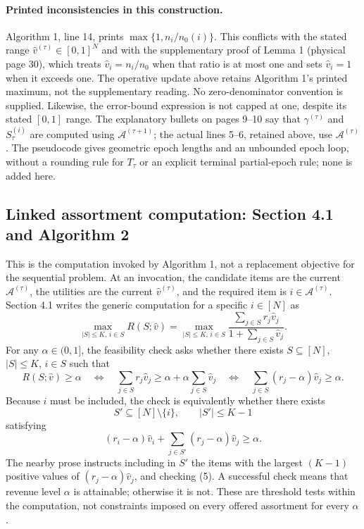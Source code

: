 \documentclass{article}
\begin{document}
\paragraph{Printed inconsistencies in this construction.}
Algorithm 1, line 14, prints $\max\{1,n_i/n_0(i)\}$. This conflicts with the stated range $\widehat v^{(\tau)}\in[0,1]^N$ and with the supplementary proof of Lemma 1 (physical page 30), which treats $\widehat v_i=n_i/n_0$ when that ratio is at most one and sets $\widehat v_i=1$ when it exceeds one. The operative update above retains Algorithm 1's printed maximum, not the supplementary reading. No zero-denominator convention is supplied. Likewise, the error-bound expression is not capped at one, despite its stated $[0,1]$ range. The explanatory bullets on pages 9--10 say that $\gamma^{(\tau)}$ and $S_\tau^{(i)}$ are computed using $\mathcal A^{(\tau+1)}$; the actual lines 5--6, retained above, use $\mathcal A^{(\tau)}$. The pseudocode gives geometric epoch lengths and an unbounded epoch loop, without a rounding rule for $T_\tau$ or an explicit terminal partial-epoch rule; none is added here.

\subsection*{Linked assortment computation: Section 4.1 and Algorithm 2}
This is the computation invoked by Algorithm 1, not a replacement objective for the sequential problem. At an invocation, the candidate items are the current $\mathcal A^{(\tau)}$, the utilities are the current $\widehat v^{(\tau)}$, and the required item is $i\in\mathcal A^{(\tau)}$. Section 4.1 writes the generic computation for a specific $i\in[N]$ as
\begin{equation}
\max_{|S|\le K,\,i\in S}R(S;\widehat v)
=\max_{|S|\le K,\,i\in S}
\frac{\sum_{j\in S}r_j\widehat v_j}{1+\sum_{j\in S}\widehat v_j}.
\tag{4}
\end{equation}
For any $\alpha\in(0,1]$, the feasibility check asks whether there exists $S\subseteq[N]$, $|S|\le K$, $i\in S$ such that
\[
R(S;\widehat v)\ge\alpha
\quad\Longleftrightarrow\quad
\sum_{j\in S}r_j\widehat v_j
\ge\alpha+\alpha\sum_{j\in S}\widehat v_j
\quad\Longleftrightarrow\quad
\sum_{j\in S}(r_j-\alpha)\widehat v_j\ge\alpha.
\]
Because $i$ must be included, the check is equivalently whether there exists
\[
S'\subseteq[N]\setminus\{i\},\qquad |S'|\le K-1
\]
satisfying
\begin{equation}
(r_i-\alpha)\widehat v_i
+\sum_{j\in S'}(r_j-\alpha)\widehat v_j\ge\alpha.
\tag{5}
\end{equation}
The nearby prose instructs including in $S'$ the items with the largest $(K-1)$ positive values of $(r_j-\alpha)\widehat v_j$, and checking (5). A successful check means that revenue level $\alpha$ is attainable; otherwise it is not. These are threshold tests within the computation, not constraints imposed on every offered assortment for every $\alpha$.
\end{document}
